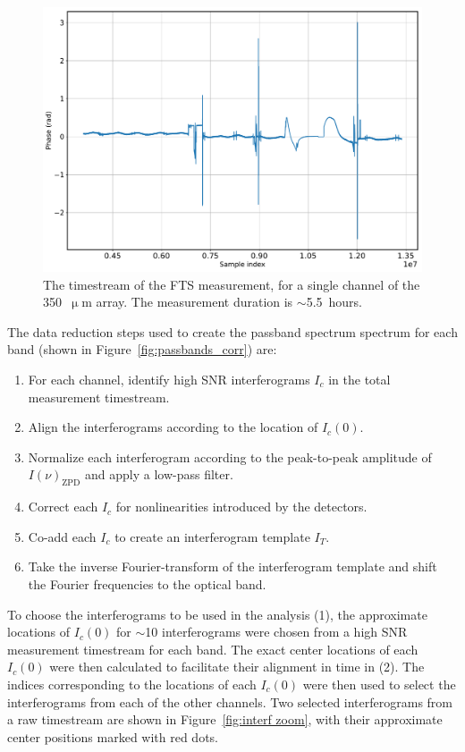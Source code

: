 \begin{figure}[!htbp]
\centering
\includegraphics[width=\textwidth]{figures/blast_data/fts/fts_long_raw}
\caption{The timestream of the FTS measurement, for a single channel of the 350~$\upmu$m array. The measurement duration is $\sim$5.5~hours.}
\label{fig:fts total meas}
\end{figure}

The data reduction steps used to create the passband spectrum spectrum for each band (shown in Figure~\ref{fig:passbands_corr}) are:

\begin{enumerate}[nosep]
  \item For each channel, identify high SNR interferograms $I_{c}$ in the total measurement timestream.
  \item Align the interferograms according to the location of $I_{c}(0)$.
  \item Normalize each interferogram according to the peak-to-peak amplitude of $I(\nu)_{\mathrm{ZPD}}$ and apply a low-pass filter.
  \item Correct each $I_{c}$ for nonlinearities introduced by the detectors.
  \item Co-add each $I_{c}$ to create an interferogram template $I_{T}$.
  \item Take the inverse Fourier-transform of the interferogram template and shift the Fourier frequencies to the optical band.
\end{enumerate}

To choose the interferograms to be used in the analysis (1), the approximate locations of $I_{c}(0)$ for $\sim$10 interferograms were chosen from a high SNR measurement timestream for each band. The exact center locations of each $I_{c}(0)$ were then calculated to facilitate their alignment in time in (2). The indices corresponding to the locations of each $I_{c}(0)$ were then used to select the interferograms from each of the other channels. Two selected interferograms from a raw timestream are shown in Figure~\ref{fig:interf zoom}, with their approximate center positions marked with red dots.

